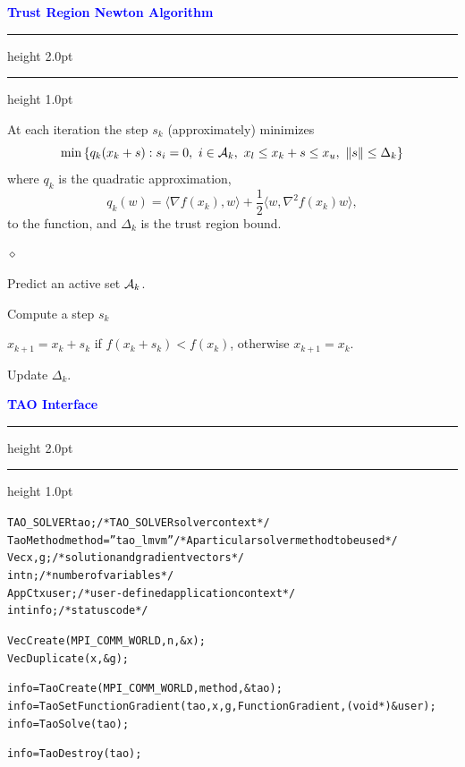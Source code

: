 \documentclass{seminar}
\newcommand{\grad}{\nabla}
\newcommand{\half}{{\textstyle{\frac{1}{2}}}}
\newcommand{\reddiamond}{\textcolor{BrickRed}{$\diamond$}}
\newcommand{\redstripe}{\textcolor{BrickRed}{\hrule height 2.0pt\hfil}
             \vspace{-1.8pt}
             \textcolor{BrickRed}{\hrule height 1.0pt\hfil}
}
\newcommand{\heading}[1]{%
   \vspace*{0.5pt}%
   \centerline{\textcolor{Blue}{\textbf{#1}}}%
   \redstripe
}
\newcommand{\cA} {\mbox{$\cal A$}}
\begin{document}
\begin{slide}

\heading{Trust Region Newton Algorithm}

At each iteration the step $s_k$  (approximately) minimizes 
\[
\min 
\left \{ 
q_k ( x_k + s ) : s_i = 0, \ i \in \cA_k , \
x_l \le x_k + s \le x_u , \ \| s \| \le \Delta_k 
\right \}
\]
where $ q_k $ is the quadratic approximation,
\[
q_k (w) = \langle \grad f (x_k ) , w \rangle + 
\half \langle w , \grad ^2 f(x_k) w \rangle ,
\]
to the function, and $ \Delta_k $ is the trust region bound.
\medskip

\begin{list}{\reddiamond}
{
\setlength{\itemsep}{0pt}
\setlength{\parsep}{0pt}
}
\item
Predict an active set $ \cA_k $.
\item
Compute a step $ s_k $ 
\item
$ x_{k+1} = x_k + s_k $ if $ f (x_k + s_k ) < f (x_k) $, 
otherwise $ x_{k+1} = x_k $.
\item
Update $ \Delta_k $.
\end{list}

\vfill

\end{slide}

\begin{slide}

\heading{TAO Interface}

\begin{alltt}
\scriptsize \setlength{\baselineskip}{10pt}
  TAO_SOLVER tao;                   /* TAO_SOLVER solver context */
  TaoMethod  method=''tao_lmvm''    /* A particular solver method to be used */
  Vec        x, g;                  /* solution and gradient vectors */
  int        n;                     /* number of variables */
  AppCtx     user;                  /* user-defined application context */
  int        info;                  /* status code */

  VecCreate(MPI_COMM_WORLD,n,&x);
  VecDuplicate(x,&g);

  info = TaoCreate(MPI_COMM_WORLD,method,&tao);
  info = TaoSetFunctionGradient(tao,x,g,FunctionGradient,(void *)&user);
  info = TaoSolve(tao);

  info = TaoDestroy(tao);
\end{alltt}

\vfill

\end{slide}
\end{document}
